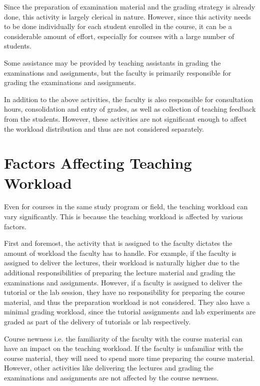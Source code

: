 \begin{enumerate}
        Since the preparation of examination material and the grading strategy is already done, this activity is largely clerical in nature. However, since this activity needs to be done individually for each student enrolled in the course, it can be a considerable amount of effort, especially for courses with a large number of students.

        Some assistance may be provided by teaching assistants in grading the examinations and assignments, but the faculty is primarily responsible for grading the examinations and assignments.

\end{enumerate}

In addition to the above activities, the faculty is also responsible for consultation hours, consolidation and entry of grades, as well as collection of teaching feedback from the students. However, these activities are not significant enough to affect the workload distribution and thus are not considered separately.

\section{Factors Affecting Teaching Workload}

Even for courses in the same study program or field, the teaching workload can vary significantly. This is because the teaching workload is affected by various factors.

First and foremost, the activity that is assigned to the faculty dictates the amount of workload the faculty has to handle. For example, if the faculty is assigned to deliver the lectures, their workload is naturally higher due to the additional responsibilities of preparing the lecture material and grading the examinations and assignments. However, if a faculty is assigned to deliver the tutorial or the lab session, they have no responsibility for preparing the course material, and thus the preparation workload is not considered. They also have a minimal grading workload, since the tutorial assignments and lab experiments are graded as part of the delivery of tutorials or lab respectively.

Course newness i.e. the familiarity of the faculty with the course material can have an impact on the teaching workload. If the faculty is unfamiliar with the course material, they will need to spend more time preparing the course material. However, other activities like delivering the lectures and grading the examinations and assignments are not affected by the course newness.

